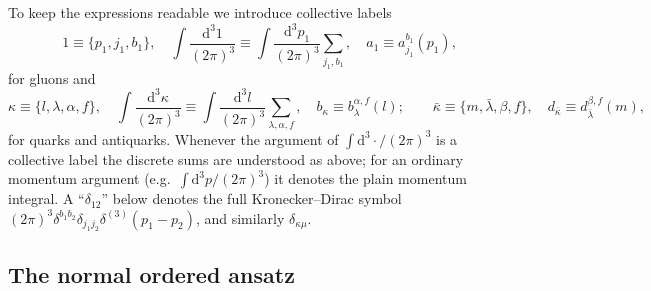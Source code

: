 \documentclass[11pt]{article}
\newcommand{\dd}{\mathrm{d}}
\newcommand{\ip}[1]{\int\!\frac{\dd^3 #1}{(2\pi)^3}}
\newcommand{\dthree}{\delta^{(3)}}
\begin{document}
To keep the expressions readable we introduce collective labels
\begin{equation}
1\equiv\{p_1,j_1,b_1\},\quad
\ip{1}\equiv\ip{p_1}\sum_{j_1,b_1},\quad a_1\equiv a^{b_1}_{j_1}(p_1),
\end{equation}
for gluons and
\begin{equation}
\kappa\equiv\{l,\lambda,\alpha,f\},\quad
\ip{\kappa}\equiv\ip{l}\sum_{\lambda,\alpha,f},\quad b_\kappa\equiv b^{\alpha,f}_{\lambda}(l);
\qquad
\bar\kappa\equiv\{m,\bar\lambda,\beta,f\},\quad d_{\bar\kappa}\equiv d^{\beta,f}_{\bar\lambda}(m),
\end{equation}
for quarks and antiquarks. Whenever the argument of $\int\!\dd^3\!\cdot/(2\pi)^3$ is a collective
label the discrete sums are understood as above; for an ordinary momentum argument
(e.g.\ $\int\!\dd^3p/(2\pi)^3$) it denotes the plain momentum integral.
A ``$\delta_{12}$'' below denotes the full Kronecker--Dirac symbol
$(2\pi)^3\delta^{b_1b_2}\delta_{j_1j_2}\dthree(p_1-p_2)$, and similarly $\delta_{\kappa\mu}$.

\subsection{The normal ordered ansatz}
\end{document}
